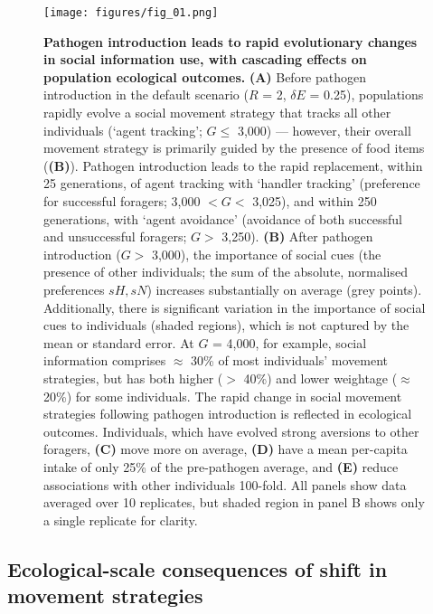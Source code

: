 \begin{figure}[!h]
    \centering
    \texttt{[image: figures/fig\_01.png]}
    \caption{
        \textbf{Pathogen introduction leads to rapid evolutionary changes in social information use, with cascading effects on population ecological outcomes.}
        \textbf{(A)} Before pathogen introduction in the default scenario ($R$ = 2, $\delta E$ = 0.25), populations rapidly evolve a social movement strategy that tracks all other individuals (`agent tracking'; $G \leq$ 3,000) --- however, their overall movement strategy is primarily guided by the presence of food items (\textbf{(B)}).
        Pathogen introduction leads to the rapid replacement, within 25 generations, of agent tracking with `handler tracking' (preference for successful foragers; 3,000 $< G <$ 3,025), and within 250 generations, with `agent avoidance' (avoidance of both successful and unsuccessful foragers; $G >$ 3,250).
        \textbf{(B)} After pathogen introduction ($G >$ 3,000), the importance of social cues (the presence of other individuals; the sum of the absolute, normalised preferences $sH, sN$) increases substantially on average (grey points).
        Additionally, there is significant variation in the importance of social cues to individuals (shaded regions), which is not captured by the mean or standard error.
        At $G$ = 4,000, for example, social information comprises $\approx$ 30\% of most individuals' movement strategies, but has both higher ($>$ 40\%) and lower weightage ($\approx$ 20\%) for some individuals.
        The rapid change in social movement strategies following pathogen introduction is reflected in ecological outcomes.
        Individuals, which have evolved strong aversions to other foragers, \textbf{(C)} move more on average, \textbf{(D)} have a mean per-capita intake of only 25\% of the pre-pathogen average, and \textbf{(E)} reduce associations with other individuals 100-fold.
        All panels show data averaged over 10 replicates, but shaded region in panel B shows only a single replicate for clarity.
    }
    \label{fig1}
\end{figure}

\subsection*{Ecological-scale consequences of shift in movement strategies}

